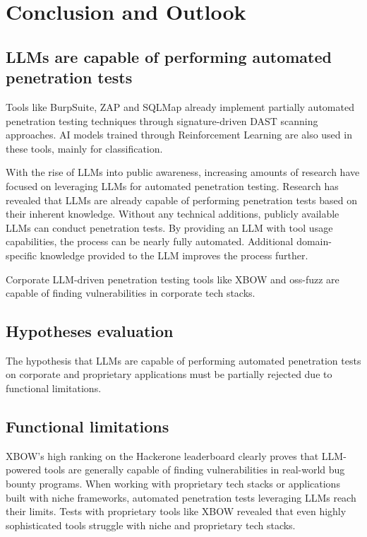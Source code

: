 \chapter{Conclusion and Outlook}
\label{ch:chapter07}

\section{LLMs are capable of performing automated penetration tests}
\label{sec:chapter06:possible}
Tools like BurpSuite, ZAP and SQLMap already implement partially automated penetration testing techniques through signature-driven \ac{DAST} scanning approaches. \ac{AI} models trained through Reinforcement Learning are also used in these tools, mainly for classification.

With the rise of \ac{LLM}s into public awareness, increasing amounts of research have focused on leveraging \ac{LLM}s for automated penetration testing. Research has revealed that \ac{LLM}s are already capable of performing penetration tests based on their inherent knowledge. Without any technical additions, publicly available \ac{LLM}s can conduct penetration tests. By providing an \ac{LLM} with tool usage capabilities, the process can be nearly fully automated. Additional domain-specific knowledge provided to the \ac{LLM} improves the process further.

Corporate \ac{LLM}-driven penetration testing tools like XBOW and oss-fuzz are capable of finding vulnerabilities in corporate tech stacks.

\section{Hypotheses evaluation}
\label{sec:chapter07:hypotheses}
The hypothesis that \ac{LLM}s are capable of performing automated penetration tests on corporate and proprietary applications must be partially rejected due to functional limitations.

\section{Functional limitations}
\label{sec:chapter07:limitations}
XBOW's high ranking on the Hackerone leaderboard clearly proves that \ac{LLM}-powered tools are generally capable of finding vulnerabilities in real-world bug bounty programs. \cite{hackerone_leaderboard} \cite{xbow_hype} When working with proprietary tech stacks or applications built with niche frameworks, automated penetration tests leveraging \ac{LLM}s reach their limits. Tests with proprietary tools like XBOW revealed that even highly sophisticated tools struggle with niche and proprietary tech stacks. 


